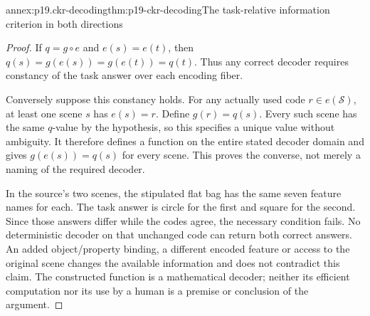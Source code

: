 \begin{annexitem}{annex:p19.ckr-decoding}{thm:p19-ckr-decoding}{The task-relative information criterion in both directions}
\begin{proof}
If \(q=g\circ e\) and \(e(s)=e(t)\), then
\(q(s)=g(e(s))=g(e(t))=q(t)\). Thus any correct decoder
requires constancy of the task answer over each encoding fiber.

Conversely suppose this constancy holds. For any actually used
code \(r\in e(\mathcal S)\), at least one scene \(s\)
has \(e(s)=r\). Define \(g(r)=q(s)\). Every such scene
has the same \(q\)-value by the hypothesis, so this specifies
a unique value without ambiguity. It therefore defines a function
on the entire stated decoder domain and gives
\(g(e(s))=q(s)\) for every scene. This proves the converse,
not merely a naming of the required decoder.

In the source's two scenes, the stipulated flat bag has the
same seven feature names for each. The task answer is circle
for the first and square for the second. Since those answers
differ while the codes agree, the necessary condition fails.
No deterministic decoder on that unchanged code can return
both correct answers. An added object/property binding, a
different encoded feature or access to the original scene
changes the available information and does not contradict this
claim. The constructed function is a mathematical decoder;
neither its efficient computation nor its use by a human is
a premise or conclusion of the argument.
\end{proof}
\end{annexitem}
